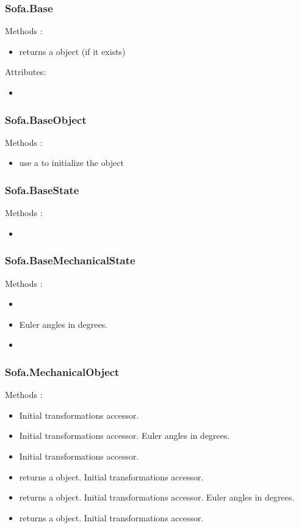 \subsubsection{Sofa.Base}
Methods :
\begin{itemize}
\item {} returns a  object (if it exists)
\end{itemize}
Attributes:
\begin{itemize}
\item {} 
\end{itemize}

\subsubsection{Sofa.BaseObject}
Methods :
\begin{itemize}
\item {} use a  to initialize the object
\end{itemize}

\subsubsection{Sofa.BaseState}
Methods :
\begin{itemize}
\item {}
\end{itemize}

\subsubsection{Sofa.BaseMechanicalState}
Methods :
\begin{itemize}
\item {}
\item {} Euler angles in degrees.
\item {} 
\end{itemize}

\subsubsection{Sofa.MechanicalObject}
Methods :
\begin{itemize}
\item {} Initial transformations accessor.
\item {} Initial transformations accessor. Euler angles in degrees.
\item {} Initial transformations accessor.
\item {} returns a  object. Initial transformations accessor.
\item {} returns a  object. Initial transformations accessor. Euler angles in degrees.
\item {} returns a  object. Initial transformations accessor.
\end{itemize}

